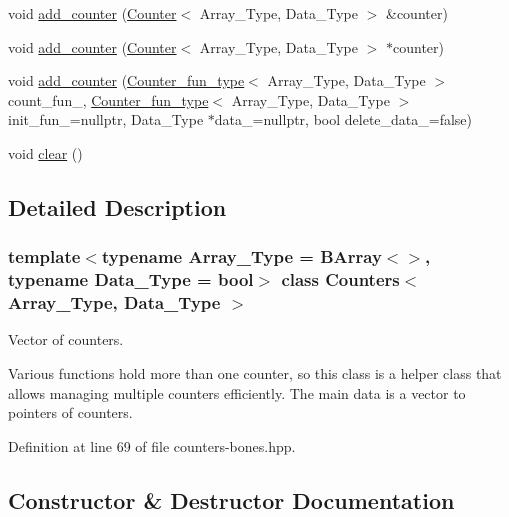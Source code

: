 \begin{DoxyCompactItemize}
void \hyperlink{class_counters_a5b5dafc7a3e0eedae400457f69937613}{add\+\_\+counter} (\hyperlink{class_counter}{Counter}$<$ Array\+\_\+\+Type, Data\+\_\+\+Type $>$ \&counter)
\item 
void \hyperlink{class_counters_a74f054aa9ea64103c2d9f79f115777d4}{add\+\_\+counter} (\hyperlink{class_counter}{Counter}$<$ Array\+\_\+\+Type, Data\+\_\+\+Type $>$ $\ast$counter)
\item 
void \hyperlink{class_counters_a4ee47504f9c76892c6028619e6b138ee}{add\+\_\+counter} (\hyperlink{typedefs_8hpp_a1e12ad6cdda3588f5b2157a5ad3177d2}{Counter\+\_\+fun\+\_\+type}$<$ Array\+\_\+\+Type, Data\+\_\+\+Type $>$ count\+\_\+fun\+\_\+, \hyperlink{typedefs_8hpp_a1e12ad6cdda3588f5b2157a5ad3177d2}{Counter\+\_\+fun\+\_\+type}$<$ Array\+\_\+\+Type, Data\+\_\+\+Type $>$ init\+\_\+fun\+\_\+=nullptr, Data\+\_\+\+Type $\ast$data\+\_\+=nullptr, bool delete\+\_\+data\+\_\+=false)
\item 
void \hyperlink{class_counters_ae4635c154970a13ce88d2e982fe7dab3}{clear} ()
\end{DoxyCompactItemize}


\subsection{Detailed Description}
\subsubsection*{template$<$typename Array\+\_\+\+Type = B\+Array$<$$>$, typename Data\+\_\+\+Type = bool$>$\newline
class Counters$<$ Array\+\_\+\+Type, Data\+\_\+\+Type $>$}

Vector of counters. 

Various functions hold more than one counter, so this class is a helper class that allows managing multiple counters efficiently. The main data is a vector to pointers of counters. 

Definition at line 69 of file counters-\/bones.\+hpp.



\subsection{Constructor \& Destructor Documentation}
\mbox{\label{class_counters_a98e4efd06b3d878609911e392a8f42ce}} 
